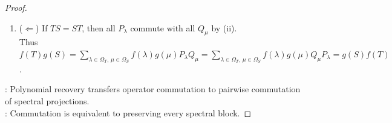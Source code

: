 \begin{theorem}
\begin{proof}
\begin{enumerate}[label=(\roman*)]
Spectral coefficients are distinct by injectivity, so spectral projections are $(P_{\lambda})_{\lambda\in\Omega_T}$ and $(Q_{\mu})_{\mu\in\Omega_S}$ by Theorem \ref{thm:spectral-resolution-normal-operator}(ii).\\
These projections commute by (ii) for $f(T)$ and $g(S)$; hence $TS=ST$ by (ii) for $T$ and $S$.
\item[$(iii)$] ($\Leftarrow$) If $TS=ST$, then all $P_{\lambda}$ commute with all $Q_{\mu}$ by (ii).\\
Thus $f(T)g(S)=\sum\limits_{\lambda\in\Omega_T,\,\mu\in\Omega_S}f(\lambda)g(\mu)P_{\lambda}Q_{\mu}=\sum\limits_{\lambda\in\Omega_T,\,\mu\in\Omega_S}f(\lambda)g(\mu)Q_{\mu}P_{\lambda}=g(S)f(T)$.
\end{enumerate}
: Polynomial recovery transfers operator commutation to pairwise commutation of spectral projections.\\
: Commutation is equivalent to preserving every spectral block.
\end{proof}
\end{theorem}

